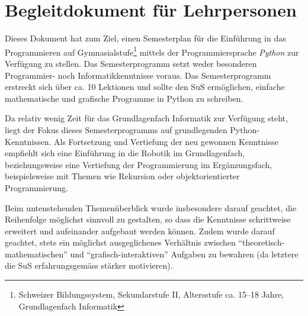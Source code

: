 \section*{Begleitdokument für Lehrpersonen}

Dieses Dokument hat zum Ziel, einen Semesterplan für die Einführung in das Programmieren auf Gymnasialstufe\footnote{Schweizer Bildungssystem, Sekundarstufe II, Altersstufe ca. 15--18 Jahre, Grundlagenfach Informatik} mittels der Programmiersprache \textit{Python} zur Verfügung zu stellen. Das Semesterprogramm setzt weder besonderen Programmier- noch Informatikkenntnisse voraus. Das Semesterprogramm erstreckt sich über ca. 10 Lektionen und sollte den SuS ermöglichen, einfache mathematische und grafische Programme in Python zu schreiben.

Da relativ wenig Zeit für das Grundlagenfach Informatik zur Verfügung steht, liegt der Fokus dieses Semesterprogramms auf grundlegenden Python-Kenntnissen. Als Fortsetzung und Vertiefung der neu gewonnen Kenntnisse empfiehlt sich eine Einführung in die Robotik im Grundlagenfach, beziehungsweise eine Vertiefung der Programmierung im Ergänzungsfach, beispielsweise mit Themen wie Rekursion oder objektorientierter Programmierung.

Beim untenstehenden Themenüberblick wurde insbesondere darauf geachtet, die Reihenfolge möglichst sinnvoll zu gestalten, so dass die Kenntnisse schrittweise erweitert und aufeinander aufgebaut werden können. Zudem wurde darauf geachtet, stets ein möglichst ausgeglichenes Verhältnis zwischen \enquote{theoretisch-mathematischen} und \enquote{grafisch-interaktiven} Aufgaben zu bewahren (da letztere die SuS erfahrungsgemäss stärker motivieren).

